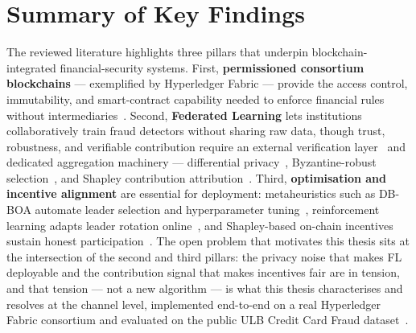 \section{Summary of Key Findings}

The reviewed literature highlights three pillars that underpin blockchain-integrated financial-security systems. First, \textbf{permissioned consortium blockchains} --- exemplified by Hyperledger Fabric --- provide the access control, immutability, and smart-contract capability needed to enforce financial rules without intermediaries~\cite{abdallah2020, li2023, prabanand2025}. Second, \textbf{Federated Learning} lets institutions collaboratively train fraud detectors without sharing raw data, though trust, robustness, and verifiable contribution require an external verification layer~\cite{mcmahan2017, li2022fdia, 10701002} and dedicated aggregation machinery --- differential privacy~\cite{dwork2006, chaudhuri2011}, Byzantine-robust selection~\cite{blanchard2017}, and Shapley contribution attribution~\cite{wang2020fedsv, ghorbani2019}. Third, \textbf{optimisation and incentive alignment} are essential for deployment: metaheuristics such as DB-BOA automate leader selection and hyperparameter tuning~\cite{prabanand2025, 9945966}, reinforcement learning adapts leader rotation online~\cite{watkins1992}, and Shapley-based on-chain incentives sustain honest participation~\cite{fedcoin2020, zhao2026sichainfl, 10529180}. The open problem that motivates this thesis sits at the intersection of the second and third pillars: the privacy noise that makes FL deployable and the contribution signal that makes incentives fair are in tension, and that tension --- not a new algorithm --- is what this thesis characterises and resolves at the channel level, implemented end-to-end on a real Hyperledger Fabric consortium and evaluated on the public ULB Credit Card Fraud dataset~\cite{ulb2018}.
